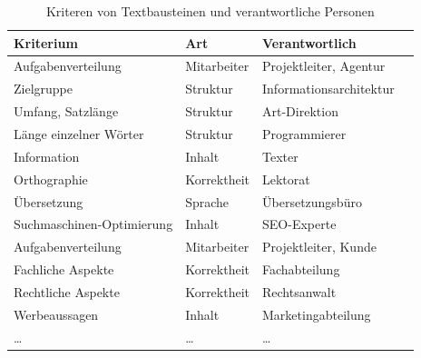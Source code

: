 \begin{table}
\begin{center}
\begin{tabular}{@{}l l l l}
\textbf{Kriterium} & \textbf{Art} & \textbf{Verantwortlich}\\
\hline
Aufgabenverteilung & Mitarbeiter & Projektleiter, Agentur \\
\hline
Zielgruppe & Struktur & Informationsarchitektur\\
\hline
Umfang, Satzlänge & Struktur & Art-Direktion\\
\hline
Länge einzelner Wörter & Struktur & Programmierer\\
\hline
Information & Inhalt & Texter\\
\hline
Orthographie & Korrektheit & Lektorat\\
\hline
Übersetzung & Sprache & Übersetzungsbüro\\
\hline
Suchmaschinen-Optimierung & Inhalt & SEO-Experte\\
\hline
Aufgabenverteilung & Mitarbeiter & Projektleiter, Kunde\\
\hline
Fachliche Aspekte & Korrektheit & Fachabteilung\\
\hline
Rechtliche Aspekte & Korrektheit & Rechtsanwalt\\
\hline
Werbeaussagen & Inhalt & Marketingabteilung\\
\hline
… & … & …
\end{tabular}
\caption{Kriteren von Textbausteinen und verantwortliche Personen}
\label{table:textkriterien}
\end{center}
\end{table}

